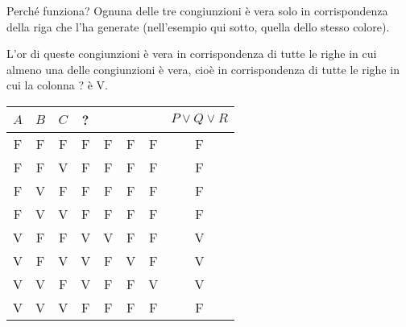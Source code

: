 \documentclass[aspectratio=169,10pt,dvipsnames,xcolor=table,handout]{beamer}
\begin{document}
\begin{frame}{Perché funziona?}
    Ognuna delle tre congiunzioni è vera solo in corrispondenza della riga che l'ha generate (nell'esempio qui sotto, quella dello stesso colore).

    \medskip
    L'or di queste congiunzioni è vera in corrispondenza di tutte le righe in cui almeno una delle congiunzioni è vera, cioè in corrispondenza di tutte le righe in cui la colonna ? è V.
    \begin{center}
        \small
        \begin{tabular}{c|c|c||c|c|c|c|c}
            $A$ & $B$ & $C$ & ? & \cellcolor{red}{$P=A \wedge \neg B \wedge \neg C$} &  \cellcolor{blue}{$Q=A \wedge \neg B \wedge  C$} &  \cellcolor{green}{$R=A \wedge  B \wedge \neg C$} &  $P \vee Q \vee R$\\
            \hline
            F   & F   & F   & F & F & F & F & F \\
            F   & F   & V   & F & F & F & F & F \\
            F   & V   & F   & F & F & F & F & F \\
            F   & V   & V   & F & F & F & F & F \\
            \cellcolor{red}V  & \cellcolor{red}F   & \cellcolor{red}F   & \cellcolor{red}V & V & F & F & V \\
            \cellcolor{blue}V   & \cellcolor{blue}F   & \cellcolor{blue}V   & \cellcolor{blue}V & F & V & F & V \\
            \cellcolor{green}V   & \cellcolor{green}V   & \cellcolor{green}F   & \cellcolor{green}V & F & F & V & V \\
            V   & V   & V   & F & F & F & F & F
        \end{tabular}
    \end{center}
\end{frame}
\end{document}
